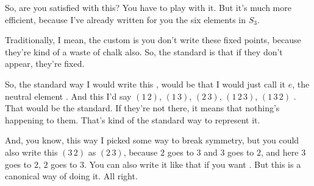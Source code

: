 \begin{content}
\end{content}

\begin{speech}[01:10:01 - 01:11:13]
So, are you satisfied with this? You have to play with it. But it's much more efficient, because I've already written for you the six elements in $S_3$.

Traditionally, I mean, the custom is you don't write these fixed points, because they're kind of a waste of chalk also. So, the standard is that if they don't appear, they're fixed.

So, the standard way I would write this , would be that I would just call it $e$, the neutral element . And this I'd say $(1\,2)$, $(1\,3)$, $(2\,3)$, $(1\,2\,3)$, $(1\,3\,2)$ . That would be the standard. If they're not there, it means that nothing's happening to them. That's kind of the standard way to represent it.

And, you know, this way I picked some way to break symmetry, but you could also write this $(3\,2)$ as $(2\,3)$, because $2$ goes to $3$ and $3$ goes to $2$, and here $3$ goes to $2$, $2$ goes to $3$. You can also write it like that if you want . But this is a canonical way of doing it. All right.
\end{speech}

